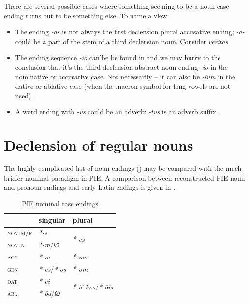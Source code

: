 \documentclass[a4paper, oneside, 12pt]{report}
\newcommand*{\citepage}[1]{p.~{#1}}
\newcommand{\form}[1]{\emph{#1}}
\newcommand*{\category}[1]{\textsc{#1}}
\begin{document}
\begin{table}[H]
    \caption{Declension endings; Roman numerals are declension classes}
    \label{tbl:declension-ending-nouns-list}
    \centering
    
\end{table}

There are several possible cases where something seeming to be a noun case ending 
turns out to be something else.
To name a view:
\begin{itemize}
    \item The ending \form{-as} is not always the first declension plural accusative ending;
    \form{-a-} could be a part of the stem of a third declension noun.
    Consider \form{vēritās}.
    \item The ending sequence \form{-io} can'be be found in 
    and we may hurry to the conclusion 
    that it's the third declension abstract noun ending \form{-io} 
    in the nominative or accusative case.
    Not necessarily -- 
    it can also be \form{-ium} in the dative or ablative case 
    (when the macron symbol for long vowels are not used).
    \item A word ending with \form{-us} could be an adverb:  
        \form{-tus} is an adverb suffix.
\end{itemize}


\section{Declension of regular nouns}
\label{sec:regular-noun-declension}


The highly complicated list of noun endings ()
may be compared with the much briefer nominal paradigm in PIE.
A comparison between reconstructed PIE noun and pronoun endings and early Latin endings
is given in \citet[\citepage{14}]{clackson2011blackwell}.

\begin{table}[H]
    \caption{PIE nominal case endings}
    \centering
    \begin{tabular}{lll}
        \toprule
                           & singular     & plural      \\
        \midrule                       
        \category{nom.m/f} & \form{*-s}   & \multirow{2}{*}{\form{*-es}} \\
        \category{nom.n}   & \form{*-m}/∅ &  \\
        \category{acc}     & \form{*-m}   & \form{*-ms} \\
        \category{gen}     & \form{*-es}/\form{*-os} & \form{*-om} \\
        \category{dat}     & \form{*-ei}  & \multirow{2}{*}{\form{*-b^hos}/\form{*-\={o}is}} \\
        \category{abl}     & \form{*-\={o}d}/∅ & \\
        \bottomrule
    \end{tabular}
\end{table}
\end{document}
